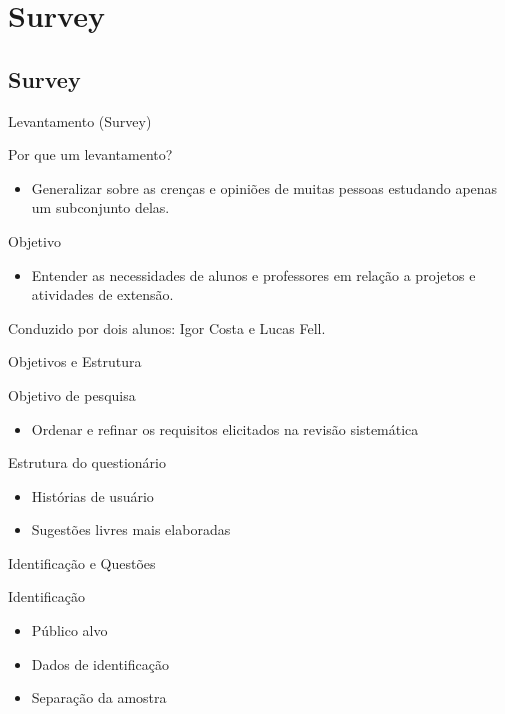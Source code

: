 \section{Survey}
\subsection*{Survey}

\begin{frame}{{\sffamily Levantamento (Survey)}}
  \begin{block}{Por que um levantamento?}
    \begin{itemize}
      \item Generalizar sobre as crenças e opiniões de muitas pessoas estudando apenas um subconjunto delas.
    \end{itemize}
  \end{block}
  \begin{block}{Objetivo}
    \begin{itemize}
      \item Entender as necessidades de alunos e professores em relação a projetos e atividades de extensão.
    \end{itemize}
  \end{block}
  Conduzido por dois alunos: Igor Costa e Lucas Fell.
\end{frame}

\begin{frame}{{\sffamily Objetivos e Estrutura}}
  \begin{block}{Objetivo de pesquisa}
    \begin{itemize}
      \item Ordenar e refinar os requisitos elicitados na revisão sistemática
    \end{itemize}
  \end{block}
  \begin{block}{Estrutura do questionário}
    \begin{itemize}
      \item Histórias de usuário
      \item Sugestões livres mais elaboradas
    \end{itemize}
  \end{block}
\end{frame}

\begin{frame}{{\sffamily Identificação e Questões}}
  \begin{block}{Identificação}
    \begin{itemize}
      \item Público alvo
      \item Dados de identificação
      \item Separação da amostra
    \end{itemize}
  \end{block}
\end{frame}

